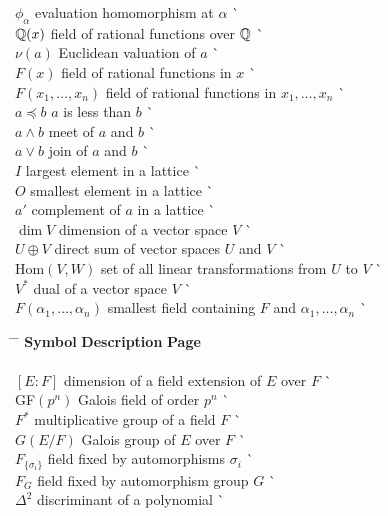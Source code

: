 \begin{tabbing}
$\phi_{\alpha}$ \> evaluation homomorphism at $\alpha$ \> \`
     \pageref{noteevalhomo} \\
${\Bbb Q}(x)$ \> field of rational functions over ${\Bbb Q}$ \> 
     \` \pageref{noteratpoly} \\
$\nu(a)$ \> Euclidean valuation of $a$ \> 
     \` \pageref{notevaluation} \\ 
$F(x)$ \> field of rational functions in $x$ \> 
     \` \pageref{noteratfun} \\
$F(x_1, \ldots, x_n)$ \> field of rational functions in 
     $x_1, \ldots, x_n$ \> \` \pageref{noteratnvar} \\ 
$a \preceq b$ \>  $a$ is less than $b$ \> \` \pageref{lessthan} \\
$a \wedge b$ \> meet of $a$ and $b$ \> \` \pageref{meet} \\
$a \vee b$ \> join of $a$ and $b$ \> \` \pageref{join} \\
$I$ \> largest element in a lattice \>
     \` \pageref{notelargeposet} \\
$O$ \> smallest element in a lattice \> 
     \` \pageref{notesmallposet} \\
$a'$ \> complement of $a$ in a lattice \> 
     \`\pageref{notedlatticecomp}  \\
$\dim V$ \> dimension of a vector space $V$ \> \` \pageref{vectdim} \\
$U \oplus V$ \> direct sum of vector spaces $U$ and $V$ \>
     \` \pageref{notedirectsum} \\
$\mbox{Hom}(V, W)$ \> set of all linear transformations from $U$ to
     $V$ \> \` \pageref{noteHom} \\
$V^\ast$ \> dual of a vector space $V$ \> \` \pageref{notedual} \\
$F( \alpha_1, \ldots, \alpha_n)$ \> smallest field containing $F$ and
     $\alpha_1, \ldots, \alpha_n$ \> \` \pageref{notefieldcont}	
\end{tabbing} \clearpage
\begin{tabbing}
\hspace{1.5in} \= \hspace{2.5in} \= \kill
{\bf Symbol}  \> {\bf Description} \>  \` {\bf Page} \\ 
     \mbox{\hspace*{1in}} \\
$[E:F]$ \> dimension of a field extension of $E$ over $F$ \> 
     \` \pageref{notedegext} \\
GF$(p^n)$ \> Galois field of order $p^n$ \> 
     \` \pageref{galoisfield} \\
$F^*$ \> multiplicative group of a field $F$ \> 
     \` \pageref{ntmultgrp} \\
$G(E/F)$ \> Galois group of $E$ over $F$ \> \`\pageref{notegalois} \\
$F_{\{\sigma_i \}}$ \> field fixed by automorphisms $\sigma_i$ \>
     \` \pageref{noteFixedfield} \\
$F_G$ \> field fixed by automorphism group $G$ \> 
     \` \pageref{noteFixedG} \\
$\Delta^2$ \> discriminant of a polynomial \>  
     \` \pageref{discriminant}
\end{tabbing}
 
 
 
 
